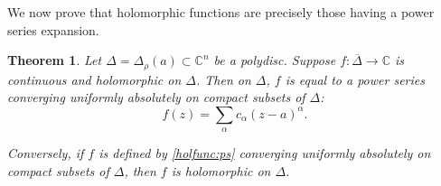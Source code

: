 \documentclass[12pt,openany]{book}
\newcommand{\C}{{\mathbb{C}}}
\theoremstyle{plain}
\newtheorem{thm}{Theorem}[section]
\theoremstyle{remark}
\theoremstyle{definition}
\theoremstyle{exercise}
\theoremstyle{example}
\begin{document}
We now prove that holomorphic functions are precisely those having
a power series expansion.

\begin{thm}
Let $\Delta = \Delta_\rho(a) \subset \C^n$ be a polydisc.
Suppose $f \colon \overline{\Delta} \to \C$ is continuous and
holomorphic on $\Delta$.  Then on $\Delta$, $f$ is equal to a power series 
converging uniformly absolutely on compact subsets of $\Delta$:
\begin{equation} \label{holfunc:ps}
f(z) = \sum_{\alpha} c_\alpha {(z-a)}^\alpha .
\end{equation}

Conversely, if $f$ is defined by \eqref{holfunc:ps} converging
uniformly absolutely on compact subsets of $\Delta$, then $f$ is holomorphic on
$\Delta$.
\end{thm}
\end{document}

